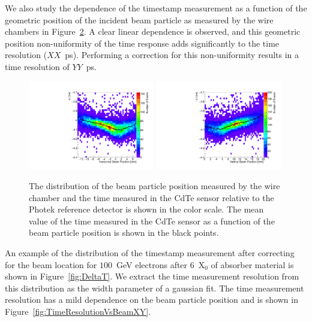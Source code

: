 \documentclass[preprint,1p]{elsarticle}
\begin{document}
\begin{figure}[htbp] 
\centering
\caption{  } 
\label{fig:DeltaTVsAmplitude} 
\end{figure} 


We also study the dependence of the timestamp measurement as a function of the geometric
position of the incident beam particle as measured by the wire chambers in 
Figure~\ref{fig:DeltaTVsBeamXY}. A clear linear dependence is observed, and this 
geometric position non-uniformity of the time response adds significantly to the 
time resolution ($XX$~ps). Performing a correction for this non-uniformity results
in a time resolution of $YY$~ps.

\begin{figure}[htbp] 
\centering
\includegraphics[width=0.49\textwidth]{figures/DeltaTVsHorizontalPosition.pdf} 
\includegraphics[width=0.49\textwidth]{figures/DeltaTVsVerticalPosition.pdf} 
\caption{ The distribution of the beam particle position measured by the wire chamber
and the time measured in the CdTe sensor relative to the Photek reference detector
is shown in the color scale. The mean value of the time measured in the CdTe sensor as a function
of the beam particle position is shown in the black points.} 
\label{fig:DeltaTVsBeamXY} 
\end{figure} 

An example of the distribution of the timestamp measurement after correcting for the
beam location for $100$~GeV electrons after $6$~$\mathrm{X}_{0}$ of absorber
material is shown in Figure~\ref{fig:DeltaT}. We extract the time measurement
resolution from this distribution as the width parameter of a gaussian fit.
The time measurement resolution has a mild dependence on the beam particle position
and is shown in Figure~\ref{fig:TimeResolutionVsBeamXY}.
\end{document}
